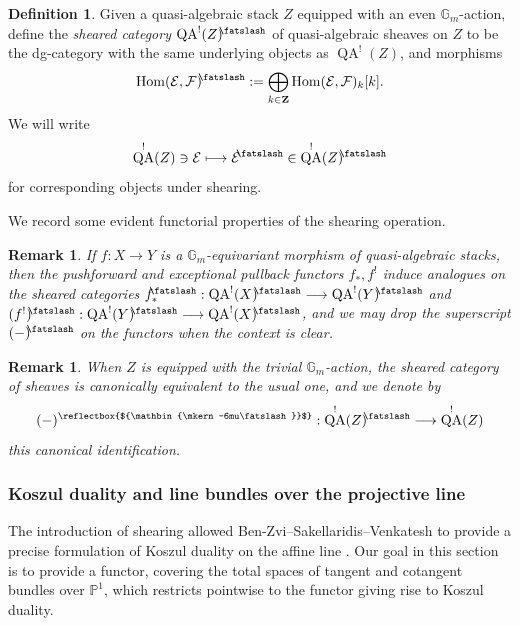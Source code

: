 \documentclass[11pt, a4paper]{amsart}
\numberwithin{equation}{section}
\newtheorem{remark}[theorem]{Remark}
\theoremstyle{definition}
\newtheorem{definition}[theorem]{Definition}
\theoremstyle{remark}
\DeclareMathOperator{\QA}{QA}
\newcommand{\shear}{{\mathbin{\mkern-6mu\fatslash}}}
\DeclareRobustCommand{\unshear}{\text{\reflectbox{$\shear$}}}
\newcommand{\Ee}{\mathcal{E}}
\newcommand{\Ff}{\mathcal{F}}
\newcommand{\GG}{\mathbb{G}}
\newcommand{\PP}{\mathbb{P}}
\renewcommand{\to}{\longrightarrow}
\begin{document}
\begin{definition}
Given a quasi-algebraic stack $Z$ equipped with an even $\GG_m$-action, define the \textit{sheared category} $\QA^!(Z)^\shear$ of quasi-algebraic sheaves on $Z$ to be the dg-category with the same underlying objects as $\QA^!(Z)$, and morphisms
\[
\mathrm{Hom}(\Ee,\Ff)^\shear := \bigoplus_{k \in \mathbf{Z}} \mathrm{Hom}(\Ee,\Ff)_k[k].
\]
We will write 
$$\QA^!(Z) \ni \Ee \longmapsto \Ee^\shear \in \QA^!(Z)^\shear$$
for corresponding objects under shearing. 
\end{definition}

We record some evident functorial properties of the shearing operation. 

\begin{remark}
If $f: X \to Y$ is a $\GG_m$-equivariant morphism of quasi-algebraic stacks, then the pushforward and exceptional pullback functors $f_*, f^!$ induce analogues on the sheared categories $f_*^\shear: \QA^!(X)^\shear \to \QA^!(Y)^\shear$ and $(f^!)^\shear: \QA^!(Y)^\shear \to \QA^!(X)^\shear$, and we may drop the superscript $(-)^\shear$ on the functors when the context is clear. 
\end{remark}

\begin{remark}
When $Z$ is equipped with the trivial $\GG_m$-action, the sheared category of sheaves is canonically equivalent to the usual one, and we denote by
\begin{equation}
    (-)^\unshear: \QA^!(Z)^\shear \to \QA^!(Z)
\end{equation}
this canonical identification. 
\end{remark}

\subsubsection{Koszul duality and line bundles over the projective line}

The introduction of shearing allowed Ben-Zvi--Sakellaridis--Venkatesh to provide a precise formulation of Koszul duality on the affine line \cite[Appendix A]{BZSV}. Our goal in this section is to provide a functor, covering the total spaces of tangent and cotangent bundles over $\PP^1$, which restricts pointwise to the functor giving rise to Koszul duality.
\end{document}
